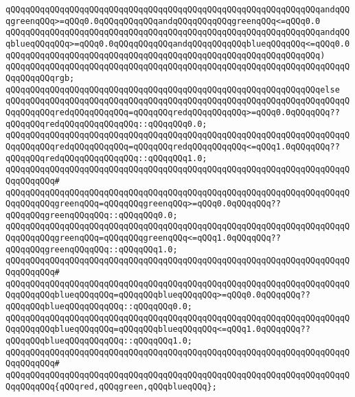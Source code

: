 \verb|qQQqqQQqqQQqqQQqqQQqqQQqqQQqqQQqqQQqqQQqqQQqqQQqqQQqqQQqqQQqqQQqandqQQqgreenqQQq>=qQQq0.0qQQqqQQqqQQqandqQQqqQQqqQQqgreenqQQq<=qQQq0.0|\newline
\verb|qQQqqQQqqQQqqQQqqQQqqQQqqQQqqQQqqQQqqQQqqQQqqQQqqQQqqQQqqQQqqQQqandqQQqblueqQQqqQQq>=qQQq0.0qQQqqQQqqQQqandqQQqqQQqqQQqblueqQQqqQQq<=qQQq0.0|\newline
\verb|qQQqqQQqqQQqqQQqqQQqqQQqqQQqqQQqqQQqqQQqqQQqqQQqqQQqqQQqqQQqqQQq)|\newline
\verb|qQQqqQQqqQQqqQQqqQQqqQQqqQQqqQQqqQQqqQQqqQQqqQQqqQQqqQQqqQQqqQQqqQQqqQQqqQQqqQQqrgb;|\newline
\verb|qQQqqQQqqQQqqQQqqQQqqQQqqQQqqQQqqQQqqQQqqQQqqQQqqQQqqQQqqQQqqQQqelse|\newline
\verb|qQQqqQQqqQQqqQQqqQQqqQQqqQQqqQQqqQQqqQQqqQQqqQQqqQQqqQQqqQQqqQQqqQQqqQQqqQQqqQQqredqQQqqQQqqQQq=qQQqqQQqredqQQqqQQqqQQq>=qQQq0.0qQQqqQQq??qQQqqQQqredqQQqqQQqqQQqqQQq::qQQqqQQq0.0;|\newline
\verb|qQQqqQQqqQQqqQQqqQQqqQQqqQQqqQQqqQQqqQQqqQQqqQQqqQQqqQQqqQQqqQQqqQQqqQQqqQQqqQQqredqQQqqQQqqQQq=qQQqqQQqredqQQqqQQqqQQq<=qQQq1.0qQQqqQQq??qQQqqQQqredqQQqqQQqqQQqqQQq::qQQqqQQq1.0;|\newline
\verb|qQQqqQQqqQQqqQQqqQQqqQQqqQQqqQQqqQQqqQQqqQQqqQQqqQQqqQQqqQQqqQQqqQQqqQQqqQQqqQQq#|\newline
\verb|qQQqqQQqqQQqqQQqqQQqqQQqqQQqqQQqqQQqqQQqqQQqqQQqqQQqqQQqqQQqqQQqqQQqqQQqqQQqqQQqgreenqQQq=qQQqqQQqgreenqQQq>=qQQq0.0qQQqqQQq??qQQqqQQqgreenqQQqqQQq::qQQqqQQq0.0;|\newline
\verb|qQQqqQQqqQQqqQQqqQQqqQQqqQQqqQQqqQQqqQQqqQQqqQQqqQQqqQQqqQQqqQQqqQQqqQQqqQQqqQQqgreenqQQq=qQQqqQQqgreenqQQq<=qQQq1.0qQQqqQQq??qQQqqQQqgreenqQQqqQQq::qQQqqQQq1.0;|\newline
\verb|qQQqqQQqqQQqqQQqqQQqqQQqqQQqqQQqqQQqqQQqqQQqqQQqqQQqqQQqqQQqqQQqqQQqqQQqqQQqqQQq#|\newline
\verb|qQQqqQQqqQQqqQQqqQQqqQQqqQQqqQQqqQQqqQQqqQQqqQQqqQQqqQQqqQQqqQQqqQQqqQQqqQQqqQQqblueqQQqqQQq=qQQqqQQqblueqQQqqQQq>=qQQq0.0qQQqqQQq??qQQqqQQqblueqQQqqQQqqQQq::qQQqqQQq0.0;|\newline
\verb|qQQqqQQqqQQqqQQqqQQqqQQqqQQqqQQqqQQqqQQqqQQqqQQqqQQqqQQqqQQqqQQqqQQqqQQqqQQqqQQqblueqQQqqQQq=qQQqqQQqblueqQQqqQQq<=qQQq1.0qQQqqQQq??qQQqqQQqblueqQQqqQQqqQQq::qQQqqQQq1.0;|\newline
\verb|qQQqqQQqqQQqqQQqqQQqqQQqqQQqqQQqqQQqqQQqqQQqqQQqqQQqqQQqqQQqqQQqqQQqqQQqqQQqqQQq#|\newline
\verb|qQQqqQQqqQQqqQQqqQQqqQQqqQQqqQQqqQQqqQQqqQQqqQQqqQQqqQQqqQQqqQQqqQQqqQQqqQQqqQQq{qQQqred,qQQqgreen,qQQqblueqQQq};|\newline

